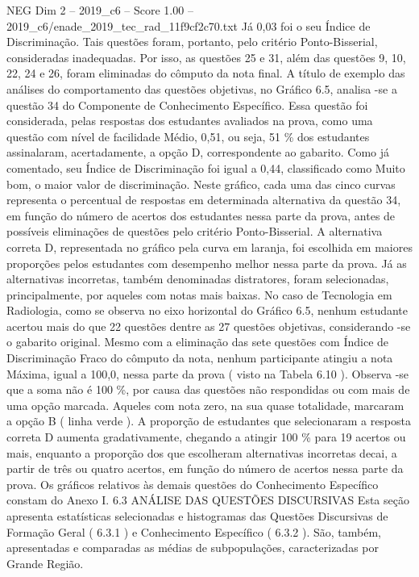 \begin{textsample}{NEG Dim 2 – 2019\_c6 – Score 1.00 – 2019\_c6/enade\_2019\_tec\_rad\_11f9cf2c70.txt}
Já 0,03 foi o seu Índice de Discriminação.
Tais questões foram, portanto, pelo critério Ponto-Bisserial, consideradas inadequadas.
Por isso, as questões 25 e 31, além das questões 9, 10, 22, 24 e 26, foram eliminadas do cômputo da nota final.
A título de exemplo das análises do comportamento das questões objetivas, no Gráfico 6.5, analisa -se a questão 34 do Componente de Conhecimento Específico.
Essa questão foi considerada, pelas respostas dos estudantes avaliados na prova, como uma questão com nível de facilidade Médio, 0,51, ou seja, 51 \% dos estudantes assinalaram, acertadamente, a opção D, correspondente ao gabarito.
Como já comentado, seu Índice de Discriminação foi igual a 0,44, classificado como Muito bom, o maior valor de discriminação.
Neste gráfico, cada uma das cinco curvas representa o percentual de respostas em determinada alternativa da questão 34, em função do número de acertos dos estudantes nessa parte da prova, antes de possíveis eliminações de questões pelo critério Ponto-Bisserial.
A alternativa correta D, representada no gráfico pela curva em laranja, foi escolhida em maiores proporções pelos estudantes com desempenho melhor nessa parte da prova.
Já as alternativas incorretas, também denominadas distratores, foram selecionadas, principalmente, por aqueles com notas mais baixas.
No caso de Tecnologia em Radiologia, como se observa no eixo horizontal do Gráfico 6.5, nenhum estudante acertou mais do que 22 questões dentre as 27 questões objetivas, considerando -se o gabarito original.
Mesmo com a eliminação das sete questões com Índice de Discriminação Fraco do cômputo da nota, nenhum participante atingiu a nota Máxima, igual a 100,0, nessa parte da prova ( visto na Tabela 6.10 ).
Observa -se que a soma não é 100 \%, por causa das questões não respondidas ou com mais de uma opção marcada.
Aqueles com nota zero, na sua quase totalidade, marcaram a opção B ( linha verde ).
A proporção de estudantes que selecionaram a resposta correta D aumenta gradativamente, chegando a atingir 100 \% para 19 acertos ou mais, enquanto a proporção dos que escolheram alternativas incorretas decai, a partir de três ou quatro acertos, em função do número de acertos nessa parte da prova.
Os gráficos relativos às demais questões do Conhecimento Específico constam do Anexo I. 6.3 ANÁLISE DAS QUESTÕES DISCURSIVAS Esta seção apresenta estatísticas selecionadas e histogramas das Questões Discursivas de Formação Geral ( 6.3.1 ) e Conhecimento Específico ( 6.3.2 ).
São, também, apresentadas e comparadas as médias de subpopulações, caracterizadas por Grande Região.

\end{textsample}
